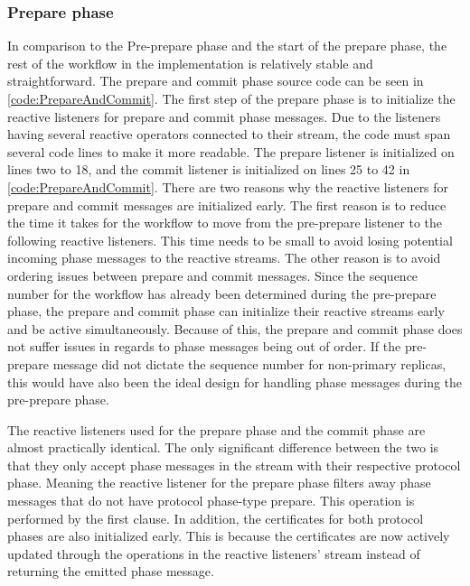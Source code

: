 \subsubsection{Prepare phase}
In comparison to the Pre-prepare phase and the start of the prepare phase, the rest of the workflow in the implementation is relatively stable and straightforward. The prepare and commit phase source code can be seen in \autoref{code:PrepareAndCommit}. The first step of the prepare phase is to initialize the reactive listeners for prepare and commit phase messages. Due to the listeners having several reactive operators connected to their stream, the code must span several code lines to make it more readable. The prepare listener is initialized on lines two to 18, and the commit listener is initialized on lines 25 to 42 in \autoref{code:PrepareAndCommit}. There are two reasons why the reactive listeners for prepare and commit messages are initialized early. The first reason is to reduce the time it takes for the workflow to move from the pre-prepare listener to the following reactive listeners. This time needs to be small to avoid losing potential incoming phase messages to the reactive streams. 
The other reason is to avoid ordering issues between prepare and commit messages. Since the sequence number for the workflow has already been determined during the pre-prepare phase, the prepare and commit phase can initialize their reactive streams early and be active simultaneously. Because of this, the prepare and commit phase does not suffer issues in regards to phase messages being out of order. If the pre-prepare message did not dictate the sequence number for non-primary replicas, this would have also been the ideal design for handling phase messages during the pre-prepare phase.

The reactive listeners used for the prepare phase and the commit phase are almost practically identical. The only significant difference between the two is that they only accept phase messages in the stream with their respective protocol phase. Meaning the reactive listener for the prepare phase filters away phase messages that do not have protocol phase-type prepare. This operation is performed by the first  clause. In addition, the certificates for both protocol phases are also initialized early. This is because the certificates are now actively updated through the operations in the reactive listeners’ stream instead of returning the emitted phase message.

